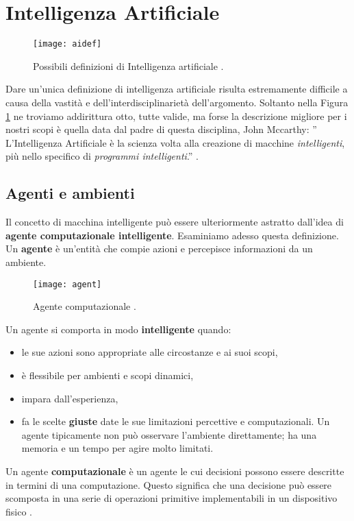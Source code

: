 \section{Intelligenza Artificiale}

\begin{figure}
    \texttt{[image: aidef]}
    \caption{Possibili definizioni di Intelligenza artificiale \cite{aima}.}
    \label{fig:ai}
  \end{figure}
Dare un'unica definizione di intelligenza artificiale risulta estremamente difficile a causa della vastità
e dell'interdisciplinarietà dell'argomento. Soltanto nella Figura \ref{fig:ai} ne troviamo addirittura otto, tutte valide, ma forse
la descrizione  migliore per i nostri scopi  è quella data dal padre di questa disciplina, John Mccarthy:
'' L'Intelligenza Artificiale è la scienza volta alla creazione di macchine  \emph{intelligenti},
più nello specifico di \emph{programmi intelligenti}.'' \cite{ai}.
\subsection{Agenti e ambienti}
Il concetto di macchina intelligente può essere ulteriormente
astratto dall'idea di \textbf{agente computazionale intelligente}. Esaminiamo adesso questa definizione.
Un \textbf{agente} è un'entità che compie azioni
e percepisce informazioni da un ambiente.

\begin{figure}
  \centering
  \texttt{[image: agent]}
  \caption{Agente computazionale \cite{aima}.}
  \label{fig:agente}
\end{figure}

Un agente si comporta in modo \textbf{intelligente} quando:
\begin{itemize}
  \item le sue azioni sono appropriate alle circostanze e ai suoi scopi,
  \item è flessibile per ambienti e scopi dinamici,
  \item impara dall'esperienza,
  \item fa le scelte \textbf{giuste} date le sue limitazioni percettive e computazionali. Un agente tipicamente
  non può osservare l'ambiente direttamente; ha una memoria e un tempo per agire molto limitati.
\end{itemize}
 Un agente \textbf{computazionale} è un agente le cui decisioni possono essere descritte in termini di una
 computazione. Questo significa che una decisione può essere scomposta in una serie di operazioni primitive
 implementabili in un dispositivo fisico \cite{PooleMackworth17}.
